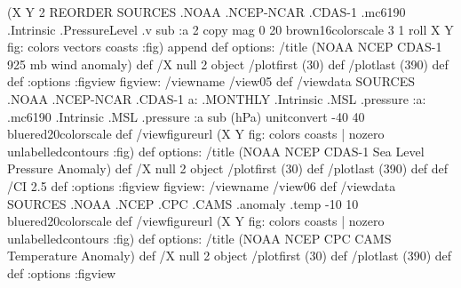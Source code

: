 \begin{ingrid}
(X Y 2 REORDER SOURCES .NOAA .NCEP-NCAR .CDAS-1 .mc6190 .Intrinsic .PressureLevel .v sub :a 2 copy  mag 0 20 brown16colorscale 3 1 roll X Y fig: colors vectors coasts :fig) append def
options:
/title (NOAA NCEP CDAS-1 925 mb wind anomaly) def
/X null 2 object
/plotfirst (30) def
/plotlast (390) def
def
:options
:figview
figview:
/viewname /view05 def
/viewdata  
 SOURCES .NOAA .NCEP-NCAR .CDAS-1
  a: .MONTHLY .Intrinsic .MSL .pressure
    :a: .mc6190 .Intrinsic .MSL .pressure :a
   sub 
(hPa) unitconvert
-40 40 bluered20colorscale
 def
/viewfigureurl (X Y fig: colors coasts | nozero unlabelledcontours :fig) def
options:
/title (NOAA NCEP CDAS-1 Sea Level Pressure Anomaly) def
/X null 2 object
/plotfirst (30) def
/plotlast (390) def
def
/CI 2.5 def
:options
:figview
figview:
/viewname /view06 def
/viewdata   
SOURCES .NOAA .NCEP .CPC .CAMS .anomaly .temp
-10 10 bluered20colorscale
    def
/viewfigureurl (X Y fig: colors coasts | nozero unlabelledcontours :fig) def
options:
/title (NOAA NCEP CPC CAMS Temperature Anomaly) def
/X null 2 object
/plotfirst (30) def
/plotlast (390) def
def
:options
:figview
\end{ingrid}
